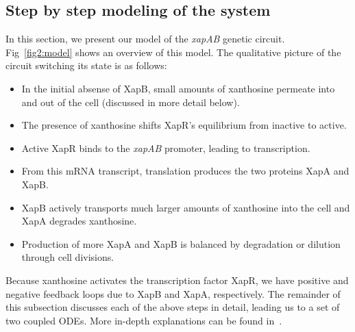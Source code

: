 \documentclass[10pt,letterpaper]{article}
\begin{document}
	\subsection*{Step by step modeling of the system}
	In this section, we present our model of the \emph{xapAB} genetic circuit.
	Fig~\ref{fig2:model} shows an overview of this model.
	The qualitative picture of the circuit switching its state is as follows:
	\begin{itemize}
		\item In the initial absense of XapB, small amounts of xanthosine permeate
				into and out of the cell (discussed in more detail below).
		\item The presence of xanthosine shifts XapR's equilibrium from inactive to active.
		\item Active XapR binds to the \emph{xapAB} promoter, leading to transcription.
		\item From this mRNA transcript, translation produces the two proteins XapA and XapB.
		\item XapB actively transports much larger amounts of xanthosine into the cell and XapA degrades xanthosine.
		\item Production of more XapA and XapB is balanced by degradation or dilution through cell divisions.
	\end{itemize}
	Because xanthosine activates the transcription factor XapR, we have positive
	and negative feedback loops due to XapB and XapA, respectively. The remainder
	of this subsection discusses each of the above steps in detail, leading us
	to a set of two coupled ODEs. More in-depth explanations can be found
	in~.
	
\end{document}

